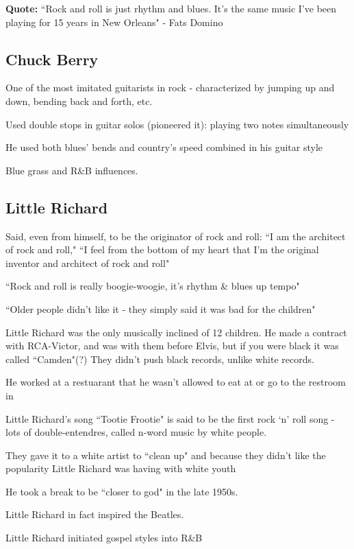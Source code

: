 \documentclass[12pt, a4paper, twoside, openright, titlepage]{book}
\begin{document}
\textbf{Quote:} ``Rock and roll is just rhythm and blues. It's the same music I've been playing for 15 years in New Orleans" - Fats Domino

\subsection{Chuck Berry}

One of the most imitated guitarists in rock - characterized by jumping up and down, bending back and forth, etc.

Used double stops in guitar solos (pioneered it): playing two notes simultaneously


He used both blues' bends and country's speed combined in his guitar style 

Blue grass and R\&B influences.


\subsection{Little Richard}

Said, even from himself, to be the originator of rock and roll: ``I am the architect of rock and roll," ``I feel from the bottom of my heart that I'm the original inventor and architect of rock and roll"

``Rock and roll is really boogie-woogie, it's rhythm \& blues up tempo"

``Older people didn't like it - they simply said it was bad for the children"

Little Richard was the only musically inclined of 12 children. He made a contract with RCA-Victor, and was with them before Elvis, but if you were black it was called ``Camden"(?) They didn't push black records, unlike white records.

He worked at a restuarant that he wasn't allowed to eat at or go to the restroom in


Little Richard's song ``Tootie Frootie" is said to be the first rock `n' roll song - lots of double-entendres, called n-word music by white people.

They gave it to a white artist to ``clean up" and because they didn't like the popularity Little Richard was having with white youth

He took a break to be ``closer to god" in the late 1950s.


Little Richard in fact inspired the Beatles.

\begin{note}{}{}
    Little Richard initiated gospel styles into R\&B
\end{note}
\end{document}
